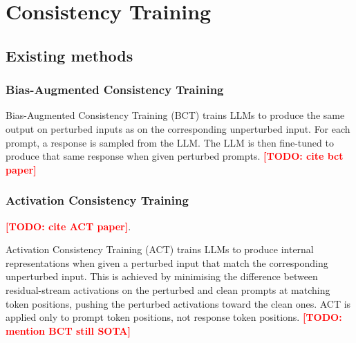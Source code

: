 \documentclass{article}
\newcommand{\todo}[1]{\textcolor{red}{\textbf{[TODO: #1]}}}
\begin{document}
\section{Consistency Training}


\subsection{Existing methods}

\subsubsection{Bias-Augmented Consistency Training}

Bias-Augmented Consistency Training (BCT) trains LLMs to produce the same output on perturbed inputs as on the corresponding unperturbed input. For each prompt, a response is sampled from the LLM. The LLM is then fine-tuned to produce that same response when given perturbed prompts. \todo{cite bct paper}


\subsubsection{Activation Consistency Training}
\todo{cite ACT paper}. 

Activation Consistency Training (ACT) trains LLMs to produce internal representations when given a perturbed input that match the corresponding unperturbed input. This is achieved by minimising the difference between residual-stream activations on the perturbed and clean prompts at matching token positions, pushing the perturbed activations toward the clean ones. ACT is applied only to prompt token positions, not response token positions. 
\todo{mention BCT still SOTA}
\end{document}
